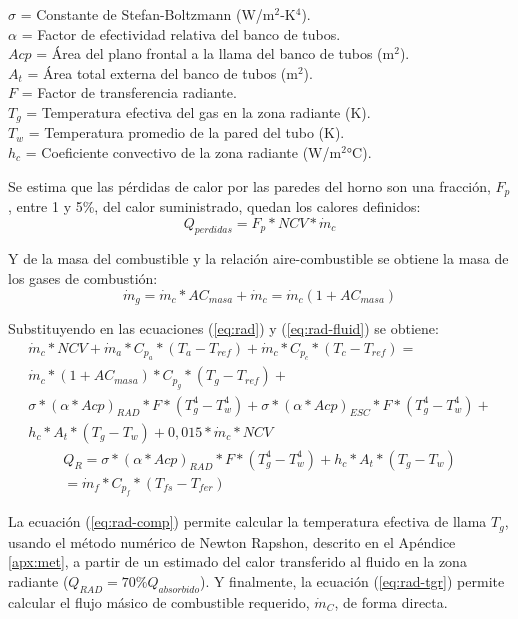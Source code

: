 $\sigma$ = Constante de Stefan-Boltzmann (W/m$^2$-K$^4$).\\
$\alpha$ = Factor de efectividad relativa del banco de tubos.\\
$Acp$ = Área del plano frontal a la llama del banco de tubos (m$^2$).\\
$A_t$ = Área total externa del banco de tubos (m$^2$).\\
$F$ = Factor de transferencia radiante.\\
$T_g$ = Temperatura efectiva del gas en la zona radiante (K).\\
$T_w$ = Temperatura promedio de la pared del tubo (K).\\
$h_c$ = Coeficiente convectivo de la zona radiante (W/m$^2$°C).
\par Se estima que las pérdidas de calor por las paredes del horno son una fracción, $F_p$, entre 1 y 5\%, del calor suministrado, quedan los calores definidos:
\begin{equation}
    Q_{perdidas} = F_p * NCV * \dot m_c
\end{equation}
\par Y de la masa del combustible y la relación aire-combustible se obtiene la masa de los gases de combustión:
\begin{equation}
    \dot m_g = \dot m_c * AC_{masa} + \dot m_c = \dot m_c (1 + AC_{masa})
\end{equation}
\par Substituyendo en las ecuaciones (\ref{eq:rad}) y (\ref{eq:rad-fluid}) se obtiene:
\begin{equation}\label{eq:rad-tgr}
\begin{gathered}
\dot m_c*NCV + \dot m_a*C_{p_a} * (T_a -T_{ref}) 
+ \dot m_c*C_{p_c} * (T_c -T_{ref}) = \\
\dot m_c*(1 +AC_{masa}) * C_{p_g} * (T_g -T_{ref}) + \\
\sigma *(\alpha *Acp)_{RAD}*F*(T_g^4-T_w^4) + 
\sigma *(\alpha *Acp)_{ESC}*F*(T_g^4-T_w^4) + \\
h_{c}*A_t*(T_g -T_w) + 0,015*\dot m_c*NCV
\end{gathered}
\end{equation}
\begin{equation}
\begin{gathered}
\label{eq:rad-comp}
Q_R = 
\sigma * (\alpha *Acp)_{RAD} *F *(T_g^4 -T_w^4) +h_{c} *A_t *(T_g -T_w)\\
= \dot m_f * C_{p_f} * (T_{fs} - T_{fer})
\end{gathered}
\end{equation}
\par La ecuación (\ref{eq:rad-comp}) permite calcular la  temperatura efectiva de llama $T_{g}$, usando el método numérico de Newton Rapshon, descrito en el Apéndice \ref{apx:met}, a partir de un estimado del calor transferido al fluido en la zona radiante ($Q_{RAD} = 70\% Q_{absorbido}$). Y finalmente, la ecuación (\ref{eq:rad-tgr}) permite calcular el flujo másico de combustible requerido, $\dot m_C$, de forma directa.

